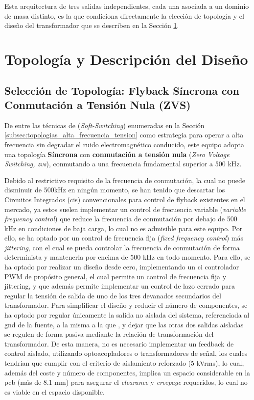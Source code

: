 Esta arquitectura de tres salidas independientes, cada una asociada a un dominio de masa distinto, es la que condiciona directamente la elección de topología y el diseño del transformador que se describen en la Sección \ref{sec:topologia_psu}.

\section{Topología y Descripción del Diseño}
\label{sec:topologia_psu}

\subsection{Selección de Topología: Flyback Síncrona con Conmutación a Tensión Nula (ZVS)}
\label{subsec:topologia_flyback_sincrono_zvs}

De entre las técnicas de  (\textit{Soft-Switching}) enumeradas en la Sección \ref{subsec:topologias_alta_frecuencia_tension} como estrategia para operar a alta frecuencia sin degradar el ruido electromagnético conducido, este equipo adopta una topología \textbf{ Síncrona} con \textbf{conmutación a tensión nula} (\textit{Zero Voltage Switching, \gls{zvs}}), conmutando a una frecuencia fundamental superior a 500 kHz.

Debido al restrictivo requisito de la frecuencia de conmutación, la cual no puede disminuir de 500kHz en ningún momento, se han tenido que descartar los Circuitos Integrados (\glspl{ci}) convencionales para control de flyback existentes en el mercado, ya estos suelen implementar un control de frecuencia variable (\textit{variable frequency control}) que reduce la frecuencia de conmutación por debajo de 500 kHz en condiciones de baja carga, lo cual no es admisible para este equipo. Por ello, se ha optado por un control de frecuencia fija (\textit{fixed frequency control}) más \textit{jittering}, con el cual se pueda controlar la frecuencia de conmutación de forma determinista y mantenerla por encima de 500 kHz en todo momento. Para ello, se ha optado por realizar un diseño desde cero, implementando un \gls{ci} controlador PWM de propósito general, el cual permite un control de frecuencia fija y jittering, y que además permite implementar un control de lazo cerrado para regular la tensión de salida de uno de los tres devanados secundarios del transformador. Para simplificar el diseño y reducir el número de componentes, se ha optado por regular únicamente la salida no aislada del sistema, referenciada al \gls{gnd} de la fuente, a la misma a la que , y dejar que las otras dos salidas aisladas se regulen de forma pasiva mediante la relación de transformación del transformador. De esta manera, no es necesario implementar un feedback de control aislado, utilizando optoacopladores o transformadores de señal, los cuales tendrían que cumplir con el criterio de aislamiento reforzado (5 kVrms), lo cual, además del coste y número de componentes, implica un espacio considerable en la \gls{pcb} (más de 8.1 mm) para asegurar el \textit{\gls{clearance}} y \textit{\gls{creepage}} requeridos, lo cual no es viable en el espacio disponible. 

